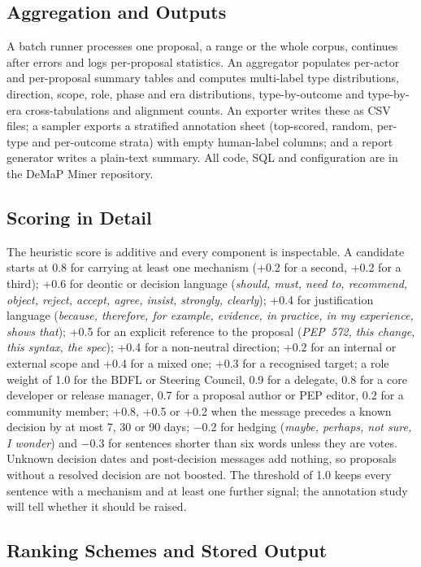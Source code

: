 \documentclass[sigconf,screen]{acmart}
\begin{document}
\subsection{Aggregation and Outputs}
\label{sec:outputs}

A batch runner processes one proposal, a range or the whole corpus, continues after errors and logs per-proposal statistics. An aggregator populates per-actor and per-proposal summary tables and computes multi-label type distributions, direction, scope, role, phase and era distributions, type-by-outcome and type-by-era cross-tabulations and alignment counts. An exporter writes these as CSV files; a sampler exports a stratified annotation sheet (top-scored, random, per-type and per-outcome strata) with empty human-label columns; and a report generator writes a plain-text summary. All code, SQL and configuration are in the DeMaP Miner repository.

\subsection{Scoring in Detail}
\label{sec:scoring}

The heuristic score is additive and every component is inspectable. A candidate starts at 0.8 for carrying at least one mechanism (+0.2 for a second, +0.2 for a third); +0.6 for deontic or decision language (\emph{should, must, need to, recommend, object, reject, accept, agree, insist, strongly, clearly}); +0.4 for justification language (\emph{because, therefore, for example, evidence, in practice, in my experience, shows that}); +0.5 for an explicit reference to the proposal (\emph{PEP~572, this change, this syntax, the spec}); +0.4 for a non-neutral direction; +0.2 for an internal or external scope and +0.4 for a mixed one; +0.3 for a recognised target; a role weight of 1.0 for the BDFL or Steering Council, 0.9 for a delegate, 0.8 for a core developer or release manager, 0.7 for a proposal author or PEP editor, 0.2 for a community member; +0.8, +0.5 or +0.2 when the message precedes a known decision by at most 7, 30 or 90 days; $-$0.2 for hedging (\emph{maybe, perhaps, not sure, I wonder}) and $-$0.3 for sentences shorter than six words unless they are votes. Unknown decision dates and post-decision messages add nothing, so proposals without a resolved decision are not boosted. The threshold of 1.0 keeps every sentence with a mechanism and at least one further signal; the annotation study will tell whether it should be raised.

\subsection{Ranking Schemes and Stored Output}
\label{sec:ranking}
\end{document}
